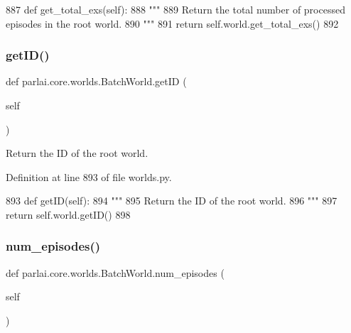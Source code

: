 \begin{DoxyCode}
887     \textcolor{keyword}{def }get\_total\_exs(self):
888         \textcolor{stringliteral}{"""}
889 \textcolor{stringliteral}{        Return the total number of processed episodes in the root world.}
890 \textcolor{stringliteral}{        """}
891         \textcolor{keywordflow}{return} self.world.get\_total\_exs()
892 
\end{DoxyCode}
\mbox{\label{classparlai_1_1core_1_1worlds_1_1BatchWorld_a995d9405ae22301e3ca46c43521b301a}} 
\subsubsection{\texorpdfstring{get\+I\+D()}{getID()}}
{\footnotesize\ttfamily def parlai.\+core.\+worlds.\+Batch\+World.\+get\+ID (\begin{DoxyParamCaption}\item[{}]{self }\end{DoxyParamCaption})}

\begin{DoxyVerb}Return the ID of the root world.
\end{DoxyVerb}
 

Definition at line 893 of file worlds.\+py.


\begin{DoxyCode}
893     \textcolor{keyword}{def }getID(self):
894         \textcolor{stringliteral}{"""}
895 \textcolor{stringliteral}{        Return the ID of the root world.}
896 \textcolor{stringliteral}{        """}
897         \textcolor{keywordflow}{return} self.world.getID()
898 
\end{DoxyCode}
\mbox{\label{classparlai_1_1core_1_1worlds_1_1BatchWorld_ae3f96cd2de72eb0f333cb29bbf74177b}} 
\subsubsection{\texorpdfstring{num\+\_\+episodes()}{num\_episodes()}}
{\footnotesize\ttfamily def parlai.\+core.\+worlds.\+Batch\+World.\+num\+\_\+episodes (\begin{DoxyParamCaption}\item[{}]{self }\end{DoxyParamCaption})}

